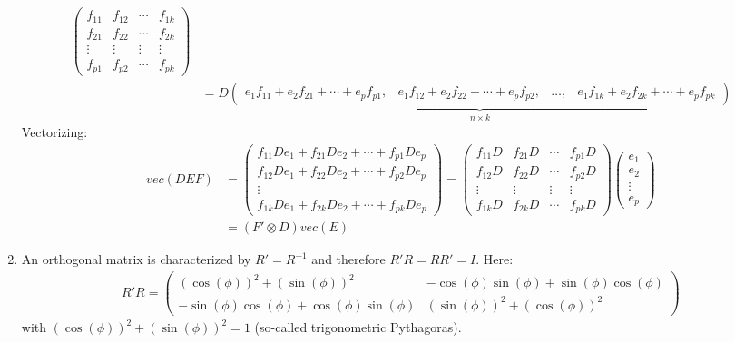 \begin{enumerate}
\begin{align*}
\begin{pmatrix}
f_{11} &f_{12} &\cdots &f_{1k} \\
f_{21} &f_{22} &\cdots &f_{2k} \\
\vdots &\vdots &\vdots &\vdots\\
f_{p1} &f_{p2} &\cdots &f_{pk}
\end{pmatrix}\\
&= D \underbrace{\begin{pmatrix} e_1f_{11}+e_2f_{21}+\cdots+e_p f_{p1},& e_1f_{12}+e_2f_{22}+\cdots+e_p f_{p2}, & \dots ,& e_1f_{1k}+e_2f_{2k}+\cdots+e_p f_{pk}\end{pmatrix}}_{n\times k}
\end{align*}
Vectorizing:
\begin{align*}
vec(DEF) &= \begin{pmatrix} f_{11}D e_1 +f_{21}D e_2+\cdots+ f_{p1}D e_p\\ f_{12}D e_1+f_{22} D e_2 + \cdots +  f_{p2} D e_p \\ \vdots \\ f_{1k} D e_1+ f_{2k} D e_2 +\cdots+ f_{pk} D e_p  \end{pmatrix}
= \begin{pmatrix} f_{11}D &  f_{21}D  & \cdots & f_{p1}D \\ f_{12}D  & f_{22} D & \cdots & f_{p2} D\\ \vdots & \vdots &\vdots&\vdots \\ f_{1k}D & f_{2k} D &\cdots& f_{pk} D  \end{pmatrix} \begin{pmatrix} e_1\\e_2\\ \vdots \\ e_p\end{pmatrix}\\
&= \left(F'\otimes D\right) vec(E)
\end{align*}

\item An orthogonal matrix is characterized by \(R'=R^{-1}\) and therefore \(R'R=R R' = I\).
Here:
\begin{align*}
R'R = \begin{pmatrix}
(\cos(\phi))^2 + (\sin(\phi))^2 & -\cos(\phi)\sin(\phi) + \sin(\phi)\cos(\phi)\\-\sin(\phi)\cos(\phi) + \cos(\phi)\sin(\phi) & (\sin(\phi))^2 + (\cos(\phi))^2
\end{pmatrix}
\end{align*}
with \((\cos(\phi))^2 + (\sin(\phi))^2 = 1\) (so-called trigonometric Pythagoras).
		 

\end{enumerate}
